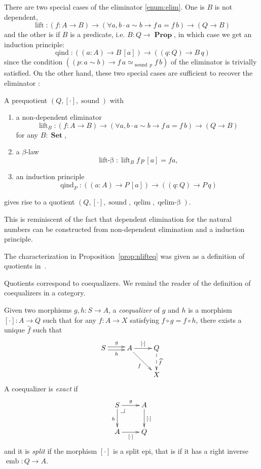 \documentclass[envcountsame]{llncs}
\makeatletter
\providecommand{\class}[1]{[#1]}
\providecommand{\dlift}[1]{\widehat{#1}}
\DeclareMathOperator{\Prop}{\mathbf{Prop}}
\DeclareMathOperator{\Set}{\mathbf{Set}}
\DeclareMathOperator{\sound}{sound}
\DeclareMathOperator{\qelimbeta}{qelim-\beta}
\DeclareMathOperator{\qind}{qind}
\DeclareMathOperator{\emb}{emb}
\DeclareMathOperator{\qelim}{qelim}
\DeclareMathOperator{\lift}{lift}
\DeclareMathOperator{\liftbeta}{lift-\beta}
\renewcommand{\equiv}{=}
\newcommand{\pullbackcorner}[1][dr]{\save*!/#1-1.2pc/#1:(-1,1)@^{|-}\restore}
\makeatother
\begin{document}
There are two special cases of the eliminator \ref{enum:elim}. One is $B$ is not dependent,
 \[\lift\colon (f\colon A \to B) \to (\forall a,b\cdot a\sim b \to f\,a \equiv f\,b) \to (Q \to B)\]
and the other is if $B$ is a predicate, i.e. $B : Q\to \Prop$, in which case we get an induction principle:
\[\qind \colon((a\colon A)\to B \,\class a)\to ((q\colon Q)\to B\,q)\]
since the condition $((p:a\sim b) \to f\,a \simeq_{\sound\,p}f\,b) $  of  the eliminator is trivially satisfied.
On the other hand, these two special cases are sufficient to recover the eliminator :      


\begin{proposition}\label{prop:nlifteq}
A prequotient $(Q,\class\cdot,\sound)$ with 

\begin{enumerate}
\item a non-dependent eliminator $$\lift_B\colon (f\colon A \to B) \to (\forall a,b\cdot a\sim b \to f\,a \equiv f\,b) \to (Q \to B)$$ for any $B\colon\Set$,
\item a $\beta$-law $$\liftbeta : \lift_B f \,p\,\class a\equiv f a,$$
\item an induction principle $$\qind_P\colon ((a\colon A)\to P \,\class a)\to ((q\colon Q)\to P\,q)$$
\end{enumerate} 
gives rise to a quotient $(Q,\class\cdot,\sound,\qelim,\qelimbeta)$.
\end{proposition}
This is reminiscent of the fact that dependent elimination for the natural numbers can be constructed from non-dependent elimination and a induction principle.

The characterization in Proposition~\ref{prop:nlifteq} was given as a definition of quotients in~\cite{hofmann:thesis}.


Quotients correspond to coequalizers. We remind the reader of the definition of coequalizers in a category. 

\begin{definition}
Given two morphisms $g,h : S\to A$, a \emph{coequalizer} of $g$ and $h$ is a morphism $\class\cdot:A\to Q$ such that for any $f:A\to X$ satisfying $f \circ g = f \circ h$, there exists a unique $\dlift f$ such that  
\[\xymatrix{
S\ar@<0.5ex>[r]^g\ar@<-0.5ex>[r]_h& A\ar[r]^{\class\cdot}\ar[dr]_{f} & Q\ar@{-->}[d]^{\dlift f}\\
&&X
}\]
A coequalizer is \emph{exact} if 
\[\xymatrix{
S\pullbackcorner\ar[r]^g\ar[d]_h & A\ar[d]^{\class\cdot} \\
A\ar[r]_{\class\cdot} & Q
}\]
and it is \emph{split} if the morphism $\class\cdot$ is a split epi, that is if it has a right inverse $\emb : Q \to A$.
\end{definition}
\end{document}
